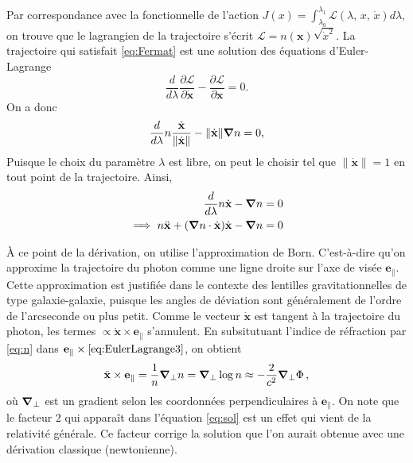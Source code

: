Par correspondance avec la fonctionnelle de l'action 
$J(x) = \int_{\lambda_0}^{\lambda_1} \mathcal{L}(\lambda,\, x,\,\dot{x}) d\lambda$, on trouve que 
le lagrangien de la trajectoire s'écrit 
$
        \mathcal{L} = n(\mathbf{x})  \sqrt{\dot{x}^{2}}.
$
La trajectoire qui satisfait \eqref{eq:Fermat} 
est une solution des équations d'Euler-Lagrange
\begin{equation}\label{eq:EulerLagrange}
        \frac{d }{d \lambda} \frac{\partial \mathcal{L}}{\partial \dot{\mathbf{x}}} - \frac{\partial \mathcal{L}}{\partial \mathbf{x}} = 0.
\end{equation} 
On a donc
\begin{equation}\label{eq:EulerLagrange2}
        \frac{d }{d \lambda} n \frac{\dot{\mathbf{x}}}{\lVert \dot{\mathbf{x}} \rVert}- \lVert \dot{\mathbf{x}} \rVert \grad n = 0 ,
\end{equation} 
Puisque le choix du paramètre $\lambda$ est libre, on peut le choisir tel 
que $\lVert \dot{\mathbf{x}} \rVert = 1$ en tout point de la trajectoire. Ainsi,
\begin{align}
        \nonumber
        \frac{d }{d \lambda} n \dot{\mathbf{x}} -  \grad n &= 0 \\
\label{eq:EulerLagrange3}
        \implies n \ddot{\mathbf{x}} + (\grad n \cdot \dot{\mathbf{x}}) \dot{\mathbf{x}} - \grad n &= 0
\end{align} 

À ce point de la dérivation, on utilise l'approximation de Born. 
C'est-à-dire qu'on approxime la trajectoire 
du photon comme une ligne droite sur l'axe de visée $\mathbf{e}_{\parallel}$. 
Cette approximation est justifiée 
dans le contexte des lentilles gravitationnelles de type galaxie-galaxie, 
puisque les angles de déviation sont généralement de 
l'ordre de l'arcseconde ou plus petit. 
Comme le vecteur $\dot{\mathbf{x}}$ est tangent à la trajectoire du photon, les termes $ \propto \dot{\mathbf{x}} \times \mathbf{e}_{\parallel} $ s'annulent. 
En subsitutuant l'indice de réfraction par \eqref{eq:n} dans $\mathbf{e}_{\parallel} \times \eqref{eq:EulerLagrange3}$, on obtient
\begin{equation}\label{eq:sol}
        \ddot{\mathbf{x}} \times \mathbf{e}_{\parallel} = \frac{1}{n} \grad_\perp n = \grad_\perp \log n
        \approx -\frac{2}{c^{2}}\grad_{\perp} \Phi\,,
\end{equation} 
où $\grad_\perp$ est un gradient selon les coordonnées perpendiculaires à $\mathbf{e}_\parallel$.
On note que le facteur 2 qui apparaît dans l'équation \eqref{eq:sol} est un 
effet qui vient de la relativité générale. Ce facteur corrige la solution 
que l'on aurait obtenue avec une dérivation classique (newtonienne).


